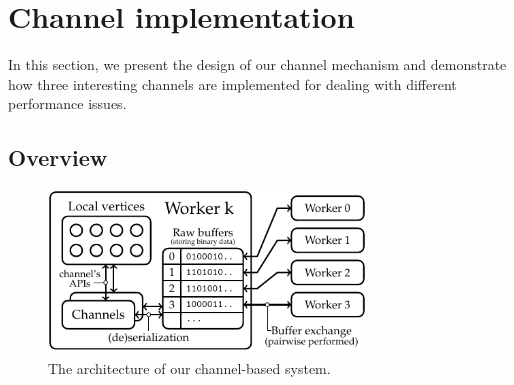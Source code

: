 \documentclass{sokendai_thesis} %
\begin{document}

\section{Channel implementation}
\label{sec:opt-channels}

In this section, we present the design of our channel mechanism and demonstrate how three interesting channels are implemented for dealing with different performance issues.

\subsection{Overview}

\begin{figure}[t]
 \centering
 \includegraphics[width=0.75\textwidth]{figures/channel.pdf}
 \caption{The architecture of our channel-based system.}
 \label{fig:channels}
\end{figure}
\end{document}
